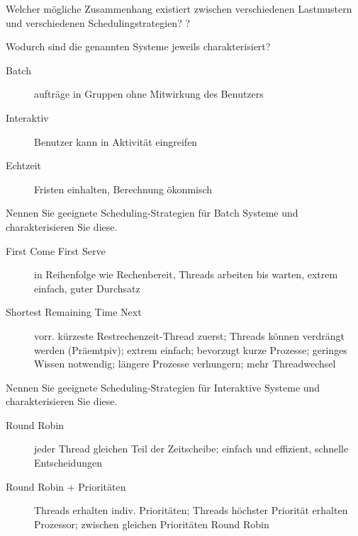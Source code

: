 \documentclass[avery5371]{flashcards}
\begin{document}
\begin{flashcard}{Welcher mögliche Zusammenhang existiert zwischen verschiedenen Lastmustern und verschiedenen Schedulingstrategien?}
    ?
\end{flashcard}

\begin{flashcard}{Wodurch sind die genannten Systeme jeweils charakterisiert?}
    \begin{description}
        \item[Batch] aufträge in Gruppen ohne Mitwirkung des Benutzers
        \item[Interaktiv] Benutzer kann in Aktivität eingreifen
        \item[Echtzeit] Fristen einhalten, Berechnung ökonmisch
    \end{description}
\end{flashcard}

\begin{flashcard}{Nennen Sie geeignete Scheduling-Strategien für Batch Systeme und charakterisieren Sie diese.}
    \begin{description}
        \item[First Come First Serve] in Reihenfolge wie Rechenbereit, Threads arbeiten bis warten, extrem einfach, guter Durchsatz
        \item[Shortest Remaining Time Next] vorr. kürzeste Restrechenzeit-Thread zuerst; Threads können verdrängt werden (Präemtpiv); extrem einfach; bevorzugt kurze Prozesse; geringes Wissen notwendig; längere Prozesse verhungern; mehr Threadwechsel
    \end{description}
\end{flashcard}

\begin{flashcard}{Nennen Sie geeignete Scheduling-Strategien für Interaktive Systeme und charakterisieren Sie diese.}
    \begin{description}
        \item[Round Robin] jeder Thread gleichen Teil der Zeitscheibe; einfach und effizient, schnelle Entscheidungen
        \item[Round Robin + Prioritäten] Threads erhalten indiv. Prioritäten; Threads höchster Priorität erhalten Prozessor; zwischen gleichen Prioritäten Round Robin
    \end{description}
\end{flashcard}
\end{document}
